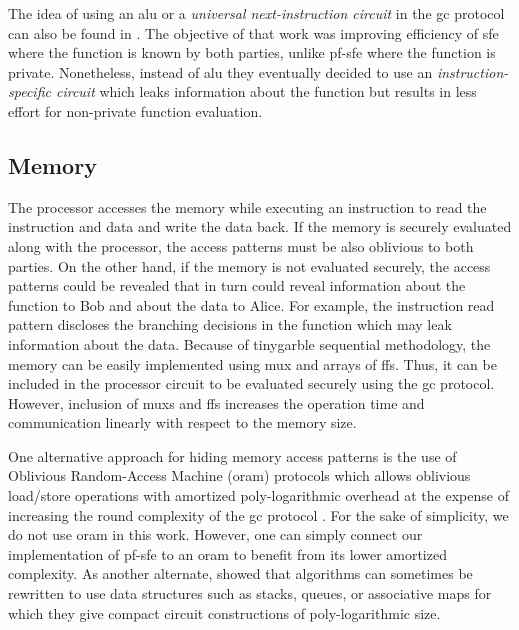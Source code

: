 The idea of using an \acrshort{alu} or a \emph{universal next-instruction circuit} in the \acrshort{gc} protocol can also be found in \cite{liu2014automating}.
The objective of that work was improving efficiency of \acrshort{sfe} where the function is known by both parties, unlike \acrshort{pf-sfe} where the function is private.
Nonetheless, instead of \acrshort{alu} they eventually decided to use an \emph{instruction-specific circuit} which leaks information about the function but results in less effort for non-private function evaluation.

\subsection{Memory}\label{ssec:processor-mem}
The processor accesses the memory while executing an instruction to read the instruction and data and write the data back.
If the memory is securely evaluated along with the processor, the access patterns must be also oblivious to both parties.
On the other hand, if the memory is not evaluated securely, the access patterns could be revealed that in turn could reveal information about the function to Bob and about the data to Alice.
For example, the instruction read pattern discloses the branching decisions in the function which may leak information about the data.
Because of \gls{tinygarble} sequential methodology, the memory can be easily implemented using \acrshort{mux} and arrays of \acrshort{ff}s.
Thus, it can be included in the processor circuit to be evaluated securely using the \acrshort{gc} protocol.
However, inclusion of \acrshort{mux}s and \acrshort{ff}s increases the operation time and communication linearly with respect to the memory size.

One alternative approach for hiding memory access patterns is the use of Oblivious Random-Access Machine (\acrshort{oram}) protocols \cite{goldreich1996software} which allows oblivious load/store operations with amortized poly-logarithmic overhead at the expense of increasing the round complexity of the \acrshort{gc} protocol \cite{gordon2012secure,liu2014automating,lu2013garble,gentry2014garbled}.
For the sake of simplicity, we do not use \acrshort{oram} in this work.
However, one can simply connect our implementation of \acrshort{pf-sfe} to an \acrshort{oram} to benefit from its lower amortized complexity.
As another alternate, \cite{zahur2013circuit} showed that algorithms can sometimes be rewritten to use data structures such as stacks, queues, or associative maps for which they give compact circuit constructions of poly-logarithmic size.

